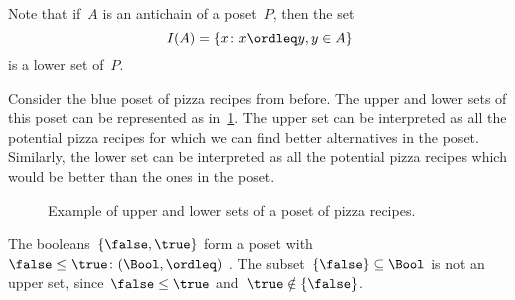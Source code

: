 \begin{remark}
Note that if~$A$ is an antichain of a poset~$P$, then the set
\begin{equation}
    I(A)=\{x\colon x\ordleq y, y\in A\}
\end{equation}
is a lower set of~$P$.
\end{remark}

Consider the blue poset of pizza recipes from before. The upper and lower sets of this poset can be represented as in~\cref{fig:upperset}. The upper set can be interpreted as all the potential pizza recipes for which we can find better alternatives in the poset. Similarly, the lower set can be interpreted as all the potential pizza recipes which would be better than the ones in the poset.

\begin{figure}[h!]
\begin{center}
\end{center}
\caption{Example of upper and lower sets of a poset of pizza recipes. \label{fig:upperset}}
\end{figure}
\begin{example}
The booleans~$\{\false, \true \}$ form a poset with~$\false \leq \true\colon(\Bool,\ordleq)$ . The subset~$\{\false\} \subseteq \Bool$ is not an upper set, since~$\false \leq \true$ and~$\true \notin \{\false \}$.	
\end{example}



